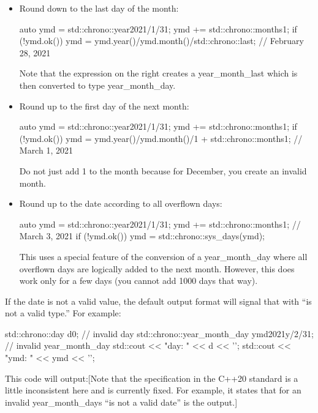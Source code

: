 \begin{itemize}
\item 
Round down to the last day of the month:

\begin{cpp}
auto ymd = std::chrono::year{2021}/1/31;
ymd += std::chrono::months{1};
if (!ymd.ok()) {
	ymd = ymd.year()/ymd.month()/std::chrono::last; // February 28, 2021
}
\end{cpp}

Note that the expression on the right creates a year\_month\_last which is then converted to type year\_month\_day.

\item 
Round up to the first day of the next month:

\begin{cpp}
auto ymd = std::chrono::year{2021}/1/31;
ymd += std::chrono::months{1};
if (!ymd.ok()) {
	ymd = ymd.year()/ymd.month()/1 + std::chrono::months{1}; // March 1, 2021
}
\end{cpp}

Do not just add 1 to the month because for December, you create an invalid month.

\item
Round up to the date according to all overflown days:

\begin{cpp}
auto ymd = std::chrono::year{2021}/1/31;
ymd += std::chrono::months{1}; // March 3, 2021
if (!ymd.ok()) {
	ymd = std::chrono::sys_days(ymd);
}
\end{cpp}

This uses a special feature of the conversion of a year\_month\_day where all overflown days are logically added to the next month. However, this does work only for a few days (you cannot add 1000 days that way).
\end{itemize}

If the date is not a valid value, the default output format will signal that with “is not a valid type.” For example:

\begin{cpp}
std::chrono::day d{0}; // invalid day
std::chrono::year_month_day ymd{2021y/2/31}; // invalid year_month_day
std::cout << "day: " << d << '\n';
std::cout << "ymd: " << ymd << '\n';
\end{cpp}

This code will output:[Note that the specification in the C++20 standard is a little inconsistent here and is currently fixed. For example, it states that for an invalid year\_month\_days “is not a valid date” is the output.]

